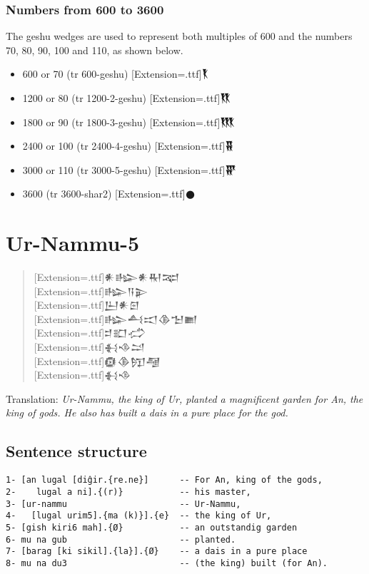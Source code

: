 \documentclass[a4paper,12pt]{book}
\newcommand{\fcm}{\large\setmainfont{Akkadian}[Extension=.ttf]}
\newcommand{\fsm}{\Large\setmainfont{Akkadian}[Extension=.ttf]}
\begin{document}
\newpage
\subsection*{Numbers from 600 to 3600}
The geshu wedges are used to represent
both multiples of 600 and the
numbers 70, 80, 90, 100 and 110,
as shown below.
\begin{itemize}
\item 600 or 70 (tr 600-geshu) {\fcm 𒐞} 
\item 1200 or 80 (tr 1200-2-geshu) {\fcm 𒐟} 
\item 1800 or 90 (tr 1800-3-geshu) {\fcm 𒐠} 
\item 2400 or 100 (tr 2400-4-geshu) {\fcm 𒐡} 
\item 3000 or 110 (tr 3000-5-geshu) {\fcm 𒐢} 
\item 3600 (tr 3600-shar2) {\fcm 𒊹}
\end{itemize}

\chapter{Ur-Nammu-5}
\begin{quotation}
{\fsm 𒀭𒈗𒀭𒊑𒉈} \\
    
{\fsm 𒈗𒀀𒉌} \\

{\fsm 𒌨𒀭𒇉} \\

{\fsm 𒈗𒋀𒀊𒆠𒈠𒆤} \\

{\fsm 𒄑𒊬𒈤} \\

{\fsm 𒈬𒈾𒁺} \\

{\fsm 𒁈𒆠𒂖𒆷} \\

{\fsm 𒈬𒈾} 
\end{quotation}
Translation:
{\em Ur-Nammu, the king of Ur, planted a magnificent
  garden for An, the king of gods. He also has built
  a dais in a pure place for the god.}

\newpage
\section*{Sentence structure}
\begin{verbatim}
1- [an lugal [diĝir.{re.ne}]      -- For An, king of the gods,
2-    lugal a ni].{(r)}           -- his master,
3- [ur-nammu                      -- Ur-Nammu,
4-   [lugal urim5].{ma (k)}].{e}  -- the king of Ur,
5- [gish kiri6 mah].{Ø}           -- an outstandig garden
6- mu na gub                      -- planted.
7- [barag [ki sikil].{la}].{Ø}    -- a dais in a pure place
8- mu na du3                      -- (the king) built (for An).
\end{verbatim}
\end{document}
